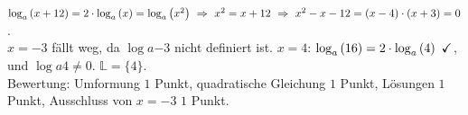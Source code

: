 \documentclass[11pt]{exam}
\begin{document}
\begin{questions}
{\begin{solution}
		$\log{a}{x+12}=2\*\log{a}{x}=\log{a}{x^2}\ \Rightarrow\ x^2=x+12\ \Rightarrow\ x^2-x-12=(x-4)\*(x+3)=0$.\\
		$x=-3$ fällt weg, da $\log{a}{-3}$ nicht definiert ist. $x=4$: $\log{a}{16}=2\*\log{a}{4}\ \checkmark$, und $\log{a}{4}\neq 0$. $\mathbb{L}=\{4\}$.\\
		Bewertung: Umformung $1$ Punkt, quadratische Gleichung $1$ Punkt, Lösungen $1$ Punkt, Ausschluss von $x=-3$ $1$ Punkt.
\end{solution}}
{\vfill}

 \end{questions}
\end{document}
